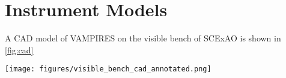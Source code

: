 \section{Instrument Models\label{sec:models}}

A CAD model of VAMPIRES on the visible bench of SCExAO is shown in \autoref{fig:cad}


\begin{figure*}
    \centering
    \texttt{[image: figures/visible\_bench\_cad\_annotated.png]}
    \caption{SCExAO visible bench including the PyWFS, FIRST injection, and VAMPIRES. VAMPIRES optics are labeled in orange and FIRST/PyWFS optics are labeled in red. The total size of the optical table shown is \SI{120}{\cm} by \SI{90}{\cm}.\label{fig:cad}}
\end{figure*}
